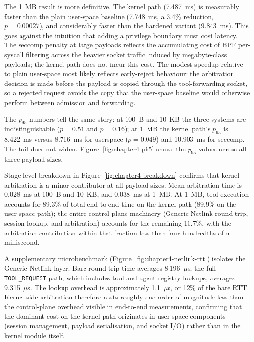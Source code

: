The 1~MB result is more definitive.
The kernel path (\num{7.487}~ms) is measurably faster than the plain user-space baseline (\num{7.748}~ms, a 3.4\% reduction, $p = 0.00027$), and considerably faster than the hardened variant (\num{9.843}~ms).
This goes against the intuition that adding a privilege boundary must cost latency.
The seccomp penalty at large payloads reflects the accumulating cost of BPF per-syscall filtering across the heavier socket traffic induced by megabyte-class payloads; the kernel path does not incur this cost.
The modest speedup relative to plain user-space most likely reflects early-reject behaviour: the arbitration decision is made before the payload is copied through the tool-forwarding socket, so a rejected request avoids the copy that the user-space baseline would otherwise perform between admission and forwarding.

The $p_{95}$ numbers tell the same story: at 100~B and 10~KB the three systems are indistinguishable ($p = 0.51$ and $p = 0.16$); at 1~MB the kernel path's $p_{95}$ is \num{8.422}~ms versus \num{8.716}~ms for userspace ($p = 0.049$) and \num{10.903}~ms for seccomp.
The tail does not widen.
Figure~\ref{fig:chapter4-p95} shows the $p_{95}$ values across all three payload sizes.

Stage-level breakdown in Figure~\ref{fig:chapter4-breakdown} confirms that kernel arbitration is a minor contributor at all payload sizes.
Mean arbitration time is \num{0.028}~ms at 100~B and 10~KB, and \num{0.038}~ms at 1~MB.
At 1~MB, tool execution accounts for \num{89.3}\% of total end-to-end time on the kernel path (\num{89.9}\% on the user-space path); the entire control-plane machinery (Generic Netlink round-trip, session lookup, and arbitration) accounts for the remaining \num{10.7}\%, with the arbitration contribution within that fraction less than four hundredths of a millisecond.

A supplementary microbenchmark (Figure~\ref{fig:chapter4-netlink-rtt}) isolates the Generic Netlink layer.
Bare round-trip time averages \num{8.196}~$\mu$s; the full \texttt{TOOL\_REQUEST} path, which includes tool and agent registry lookups, averages \num{9.315}~$\mu$s.
The lookup overhead is approximately \num{1.1}~$\mu$s, or 12\% of the bare RTT.
Kernel-side arbitration therefore costs roughly one order of magnitude less than the control-plane overhead visible in end-to-end measurements, confirming that the dominant cost on the kernel path originates in user-space components (session management, payload serialisation, and socket I/O) rather than in the kernel module itself.

